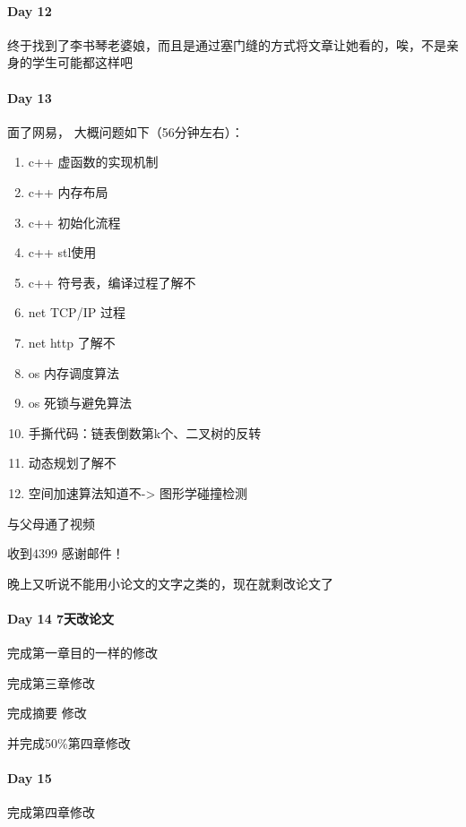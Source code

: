 \documentclass[UTF8,a4paper,8pt]{ctexart}
\begin{document}
 	 \paragraph{Day 12      \quad     }
	 	 终于找到了李书琴老婆娘，而且是通过塞门缝的方式将文章让她看的，唉，不是亲身的学生可能都这样吧
	 	 
	 	 
 	 \paragraph{Day 13      \quad     }
	 	 面了网易， 大概问题如下（56分钟左右）：
		 	 \begin{enumerate}[itemindent = 1em]
		 	 	\item c++ 虚函数的实现机制
		 	 	\item c++ 内存布局
		 	 	\item c++ 初始化流程
		 	 	\item c++ stl使用
		 	 	\item c++ 符号表，编译过程了解不
		 	 	
		 	 	\item net TCP/IP 过程
		 	 	\item net http 了解不
		 	 	
		 	 	\item os 内存调度算法
		 	 	\item os 死锁与避免算法
		 	 	
		 	 	\item 手撕代码：链表倒数第k个、二叉树的反转
		 	 	\item 动态规划了解不
		 	 	\item 空间加速算法知道不-> 图形学碰撞检测
		 	 \end{enumerate}
	 	 
	 	 
	 	 与父母通了视频
	 	 
	 	 收到4399 感谢邮件！
	 	 
	 	 晚上又听说不能用小论文的文字之类的，现在就剩改论文了
	 	 
 	 \paragraph{Day 14  7天改论文    \quad     }
	 	 完成第一章目的一样的修改
 	 
	 	 完成第三章修改
	 	 
	 	 完成摘要 修改
	 	 
	 	 并完成50\%第四章修改
	 	 
 	 \paragraph{Day 15      \quad     }
	 	 完成第四章修改
	 	 
\end{document}
